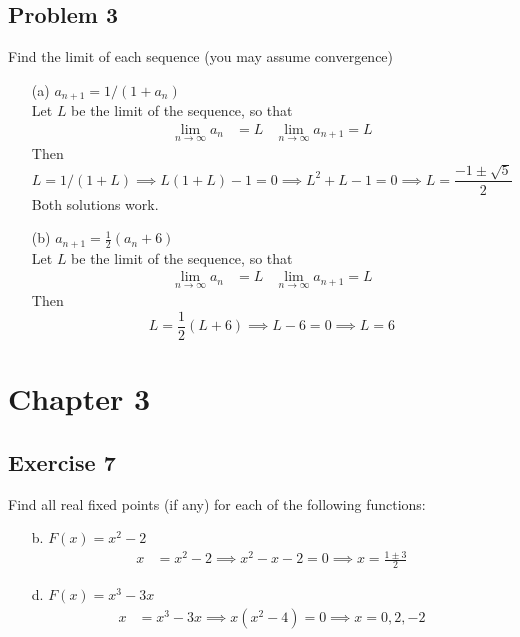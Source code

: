 \documentclass{article}
\begin{document}
\subsection*{Problem 3}
Find the limit of each sequence (you may assume convergence)
\begin{itemize}
	\item[(a)] $a_{n+1} = 1/(1+a_n)$ \\
	Let $L$ be the limit of the sequence, so that
	\begin{align*}
		\lim_{n \to \infty} a_n &= L & \lim_{n \to \infty} a_{n+1} = L
	\end{align*}
	Then
	\[
		L = 1/(1+L) \implies L(1+L) - 1 = 0 \implies L^2 + L - 1 = 0 \implies L = \frac{-1 \pm \sqrt{5}}{2}
	\]
	Both solutions work.
	\item[(b)] $a_{n+1} = \frac{1}{2}(a_n + 6)$ \\
	Let $L$ be the limit of the sequence, so that
	\begin{align*}
		\lim_{n \to \infty} a_n &= L & \lim_{n \to \infty} a_{n+1} = L
	\end{align*}
	Then
	\[
		L = \frac{1}{2}(L + 6) \implies L - 6 = 0 \implies L = 6
	\]
\end{itemize}	
\section*{Chapter 3}
\subsection*{Exercise 7}
Find all real fixed points (if any) for each of the following functions:
\begin{itemize}
	\item[b.] $F(x) = x^2 - 2$
		\begin{align*}
			x &= x^2 - 2 \implies x^2 - x - 2 = 0 \implies x = \frac{1 \pm 3}{2}
		\end{align*}
	\item[d.] $F(x) = x^3 - 3x$	
		\begin{align*}
			x &= x^3 - 3x \implies x(x^2 - 4) = 0 \implies x = 0,2,-2
		\end{align*}
\end{itemize}
\end{document}
